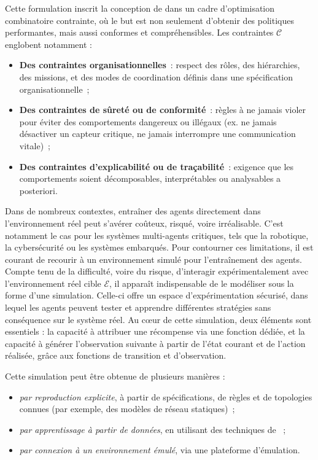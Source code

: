\noindent
Cette formulation inscrit la conception de  dans un cadre d'optimisation combinatoire contrainte, où le but est non seulement d'obtenir des politiques performantes, mais aussi conformes et compréhensibles.
%
Les contraintes $\mathcal{C}$ englobent notamment :
\begin{itemize}
  \item \textbf{Des contraintes organisationnelles}~: respect des rôles, des hiérarchies, des missions, et des modes de coordination définis dans une spécification organisationnelle~;
  \item \textbf{Des contraintes de sûreté ou de conformité}~: règles à ne jamais violer pour éviter des comportements dangereux ou illégaux (ex. ne jamais désactiver un capteur critique, ne jamais interrompre une communication vitale)~;
  \item \textbf{Des contraintes d'explicabilité ou de traçabilité}~: exigence que les comportements soient décomposables, interprétables ou analysables a posteriori.
\end{itemize}

Dans de nombreux contextes, entraîner des agents directement dans l'environnement réel peut s'avérer coûteux, risqué, voire irréalisable. C'est notamment le cas pour les systèmes multi-agents critiques, tels que la robotique, la cybersécurité ou les systèmes embarqués. Pour contourner ces limitations, il est courant de recourir à un environnement simulé pour l'entraînement des agents. Compte tenu de la difficulté, voire du risque, d'interagir expérimentalement avec l'environnement réel cible $\mathcal{E}$, il apparaît indispensable de le modéliser sous la forme d'une simulation. Celle-ci offre un espace d'expérimentation sécurisé, dans lequel les agents peuvent tester et apprendre différentes stratégies sans conséquence sur le système réel. Au cœur de cette simulation, deux éléments sont essentiels : la capacité à attribuer une récompense via une fonction dédiée, et la capacité à générer l'observation suivante à partir de l'état courant et de l'action réalisée, grâce aux fonctions de transition et d'observation.


Cette simulation peut être obtenue de plusieurs manières :
\begin{itemize}
  \item \emph{par reproduction explicite}, à partir de spécifications, de règles et de topologies connues (par exemple, des modèles de réseau statiques)~;
  \item \emph{par apprentissage à partir de données}, en utilisant des techniques de ~;
  \item \emph{par connexion à un environnement émulé}, via une plateforme d'émulation.
\end{itemize}

